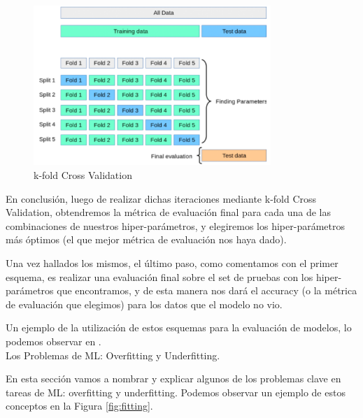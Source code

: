 \documentclass[12pt,a4paper]{article}
\makeatletter
\renewcommand\paragraph{\@startsection{paragraph}{4}{\z@}
            {-2.5ex\@plus -1ex \@minus -.25ex}
            {1.25ex \@plus .25ex}
            {\normalfont\normalsize\bfseries}}
\makeatother
\begin{document}
\begin{sloppypar}
\begin{figure}[H]    %
 \centering
 \includegraphics[width=0.8\textwidth]{images/Cross_Validation.png}
 \caption[k-fold Cross Validation.]{k-fold Cross Validation\protect\footnotemark}
 \label{fig:cross_val}
\end{figure}


En conclusión, luego de realizar dichas iteraciones mediante k-fold Cross Validation, obtendremos la métrica de evaluación final para cada una de las combinaciones de nuestros hiper-parámetros, y elegiremos los hiper-parámetros más óptimos (el que mejor métrica de evaluación nos haya dado). 

Una vez hallados los mismos, el último paso, como comentamos con el primer esquema, es realizar una evaluación final sobre el set de pruebas con los hiper-parámetros que encontramos, y de esta manera nos dará el accuracy (o la métrica de evaluación que elegimos) para los datos que el modelo no vio.

Un ejemplo de la utilización de estos esquemas para la evaluación de modelos, lo podemos observar en \textit{}.\\

\paragraph{Los Problemas de ML: Overfitting y Underfitting.}\label{Over_y_under}

En esta sección vamos a nombrar y explicar algunos de los problemas clave en tareas de ML: overfitting y underfitting. Podemos observar un ejemplo de estos conceptos en la Figura \ref{fig:fitting}.


\end{sloppypar}
\end{document}

